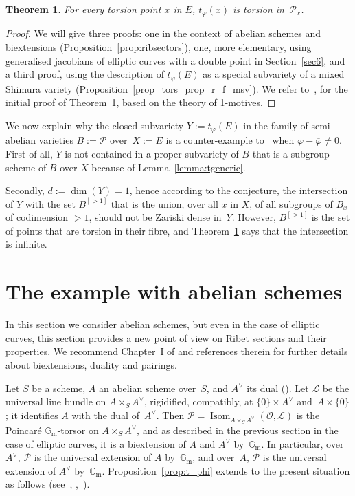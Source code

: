 \documentclass[JEP,XML,SOM,Unicode,NoFloatCountersInSection]{cedram}
\let\mathcal\mathscr
\let\oldvee\vee
\renewcommand{\vee}{{\scriptscriptstyle\oldvee}}
\theoremstyle{plain}
\newtheorem{Theorem}[subsection]{Theorem}
\theoremstyle{definition}
\numberwithin{equation}{subsection}
\let\ol\overline
\let\phi\varphi
\renewcommand{\G}{\mathbb G}
\newcommand{\calL}{\mathcal{L}}
\newcommand{\calO}{\mathcal{O}}
\newcommand{\calP}{\mathcal{P}}
\newcommand{\Gm}{\G_{\mathrm{m}}}
\DeclareMathOperator{\Isom}{Isom}
\begin{document}
\begin{Theorem}\label{thm:ttorsionproperty}
For every torsion point $x$ in $E$, $t_\phi(x)$ is torsion in~$\calP_x$.
\end{Theorem}
\begin{proof}
We will give three proofs: one in the context of abelian schemes and
biextensions (Proposition~\ref{prop:ribsectors}), one, more
elementary, using generalised jacobians of elliptic curves with a
double point in Section~\ref{sec6}, and a third proof, using the
description of $t_\phi(E)$ as a special subvariety of a mixed
Shimura variety (Proposition~\ref{prop_tors_prop_r_f_msv}).
We refer to~\cite[\S 1]{Bertrand11}, for the initial proof of
Theorem~\ref{thm:ttorsionproperty}, based on the theory of 1-motives.
\end{proof}
We now explain why the closed subvariety
$Y:=t_\phi(E)$ in the family of semi-abelian varieties $B:=\calP$
over~$X:=E$ is a counter-example to~\cite[Conj.\,6.1]{Pink2} when
$\phi-\ol{\phi}\neq 0$.
First of all, $Y$ is not contained in a proper subvariety of $B$ that
is a subgroup scheme of $B$ over $X$ because of
Lemma~\ref{lemma:tgeneric}.

Secondly, $d:=\dim(Y)=1$, hence according to the conjecture, the
intersection of $Y$ with the set $B^{[>1]}$ that is the union, over
all $x$ in $X$, of all subgroups of $B_x$ of codimension $>1$, should
not be Zariski dense in~$Y$. However, $B^{[>1]}$ is the set of points
that are torsion in their fibre, and
Theorem~\ref{thm:ttorsionproperty} says that the intersection is
infinite.

\section{The example with abelian schemes}\label{sec3}

In this section we consider abelian schemes, but even in the case of
elliptic curves, this section provides a new point of view on
Ribet sections and their properties. We recommend Chapter~I of
\cite{Moret-Bailly} and references therein for further details about
biextensions, duality and pairings.

Let $S$ be a scheme, $A$ an abelian scheme over~$S$, and $A^\vee$ its
dual (\cite[\S I.1]{Faltings-Chai}). Let $\calL$ be the
universal line bundle on $A\times_S A^\vee$, rigidified, compatibly,
at $\{0\}\times A^\vee$ and~$A\times\{0\}$; it identifies $A$ with the
dual of~$A^\vee$. Then $\calP=\Isom_{A\times_S A^\vee}(\calO,\calL)$
is the Poincaré $\Gm$-torsor on $A\times_S A^\vee$, and as described
in the previous section in the case of elliptic curves, it is a
biextension of $A$ and $A^\vee$ by~$\Gm$. In particular,
over~$A^\vee$, $\calP$ is the universal extension of $A$ by~$\Gm$, and
over~$A$, $\calP$ is the universal extension of $A^\vee$
by~$\Gm$. Proposition~\ref{prop:t_phi} extends to the present
situation as follows (see~\cite{Breen}, \hbox{\cite{Chambert-Loir99},
\cite[\S 8.3]{Lopuhaa}}).
\end{document}
